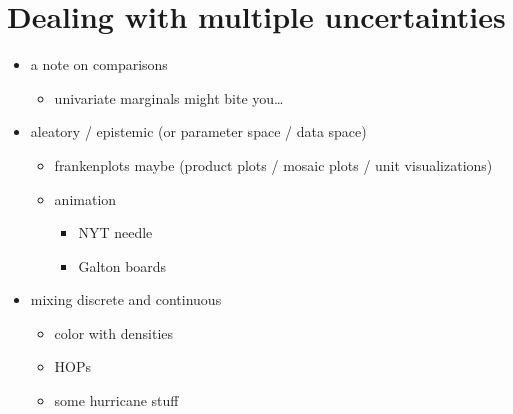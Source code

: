 \documentclass[]{book}
\providecommand{\tightlist}{%
  \setlength{\itemsep}{0pt}\setlength{\parskip}{0pt}}
\theoremstyle{definition}
\theoremstyle{definition}
\theoremstyle{definition}
\theoremstyle{remark}
\begin{document}
\hypertarget{ch-multiple}{%
\chapter{Dealing with multiple uncertainties}\label{ch-multiple}}

\begin{itemize}
\tightlist
\item
  a note on comparisons

  \begin{itemize}
  \tightlist
  \item
    univariate marginals might bite you\ldots{}
  \end{itemize}
\item
  aleatory / epistemic (or parameter space / data space)

  \begin{itemize}
  \tightlist
  \item
    frankenplots maybe (product plots / mosaic plots / unit
    visualizations)
  \item
    animation

    \begin{itemize}
    \tightlist
    \item
      NYT needle
    \item
      Galton boards
    \end{itemize}
  \end{itemize}
\item
  mixing discrete and continuous

  \begin{itemize}
  \tightlist
  \item
    color with densities
  \item
    HOPs
  \item
    some hurricane stuff
  \end{itemize}
\end{itemize}


\end{document}

